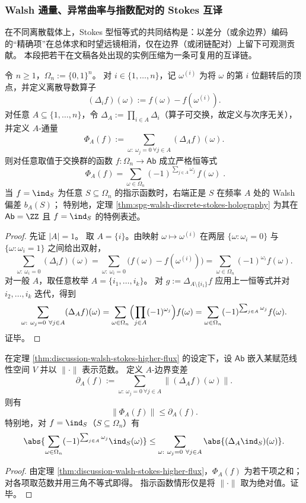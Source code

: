 \subsubsection{Walsh 通量、异常曲率与指数配对的 Stokes 互译}\label{subsubsec:discussion-generalized-stokes-spectral-hierarchy}
在不同离散载体上，Stokes 型恒等式的共同结构是：以差分（或余边界）编码的“精确项”在总体求和时望远镜相消，仅在边界（或闭链配对）上留下可观测贡献。
本段把若干在文稿各处出现的实例压缩为一条可复用的互译链。

\begin{theorem}\label{thm:discussion-walsh-stokes-higher-flux}
令 \(n\ge 1\)，\(\Omega_n:=\{0,1\}^n\)。
对 \(i\in\{1,\dots,n\}\)，记 \(\omega^{(i)}\) 为将 \(\omega\) 的第 \(i\) 位翻转后的顶点，并定义离散导数算子
\[
(\Delta_i f)(\omega):=f(\omega)-f(\omega^{(i)}).
\]
对任意 \(A\subseteq\{1,\dots,n\}\)，令 \(\Delta_A:=\prod_{i\in A}\Delta_i\)（算子可交换，故定义与次序无关），并定义 \(A\)-通量
\[
\Phi_A(f):=\sum_{\omega:\ \omega_j=0\ \forall j\in A}(\Delta_A f)(\omega).
\]
则对任意取值于交换群的函数 \(f:\Omega_n\to \mathsf{Ab}\) 成立严格恒等式
\[
\boxed{\;
\Phi_A(f)=\sum_{\omega\in\Omega_n}(-1)^{\sum_{j\in A}\omega_j}\,f(\omega)\; }.
\]
当 \(f=\ind_S\) 为任意 \(S\subseteq\Omega_n\) 的指示函数时，右端正是 \(S\) 在频率 \(A\) 处的 Walsh 偏差 \(b_A(S)\)；
特别地，定理 \ref{thm:spg-walsh-discrete-stokes-holography} 为其在 \(\mathsf{Ab}=\ZZ\) 且 \(f=\ind_S\) 的特例表述。
\end{theorem}
\begin{proof}
先证 \(|A|=1\)。
取 \(A=\{i\}\)。由映射 \(\omega\mapsto\omega^{(i)}\) 在两层 \(\{\omega:\omega_i=0\}\) 与 \(\{\omega:\omega_i=1\}\) 之间给出双射，
\[
\sum_{\omega:\ \omega_i=0}(\Delta_i f)(\omega)
=\sum_{\omega:\ \omega_i=0}\bigl(f(\omega)-f(\omega^{(i)})\bigr)
=\sum_{\omega\in\Omega_n}(-1)^{\omega_i}f(\omega).
\]
对一般 \(A\)，取任意枚举 \(A=\{i_1,\dots,i_k\}\)。
对 \(g:=\Delta_{A\setminus\{i_1\}}f\) 应用上一恒等式并对 \(i_2,\dots,i_k\) 迭代，得到
\[
\sum_{\omega:\ \omega_j=0\ \forall j\in A}(\Delta_A f)(\omega)
=\sum_{\omega\in\Omega_n}\Bigl(\prod_{j\in A}(-1)^{\omega_j}\Bigr)f(\omega)
=\sum_{\omega\in\Omega_n}(-1)^{\sum_{j\in A}\omega_j}f(\omega).
\]
证毕。
\end{proof}

\begin{corollary}\label{cor:discussion-walsh-bias-controlled-by-boundary-variation}
在定理 \ref{thm:discussion-walsh-stokes-higher-flux} 的设定下，设 \(\mathsf{Ab}\) 嵌入某赋范线性空间 \(V\) 并以 \(\|\cdot\|\) 表示范数。
定义 \(A\)-边界变差
\[
\partial_A(f):=\sum_{\omega:\ \omega_j=0\ \forall j\in A}\bigl\|(\Delta_A f)(\omega)\bigr\|.
\]
则有
\[
\bigl\|\Phi_A(f)\bigr\|\le \partial_A(f).
\]
特别地，对 \(f=\ind_S\)（\(S\subseteq\Omega_n\)）有
\[
\abs{\sum_{\omega\in\Omega_n}(-1)^{\sum_{j\in A}\omega_j}\ind_S(\omega)}
\le
\sum_{\omega:\ \omega_j=0\ \forall j\in A}\abs{(\Delta_A\ind_S)(\omega)}.
\]
\end{corollary}
\begin{proof}
由定理 \ref{thm:discussion-walsh-stokes-higher-flux}，\(\Phi_A(f)\) 为若干项之和；对各项取范数并用三角不等式即得。
指示函数情形仅是将 \(\|\cdot\|\) 取为绝对值。证毕。
\end{proof}

